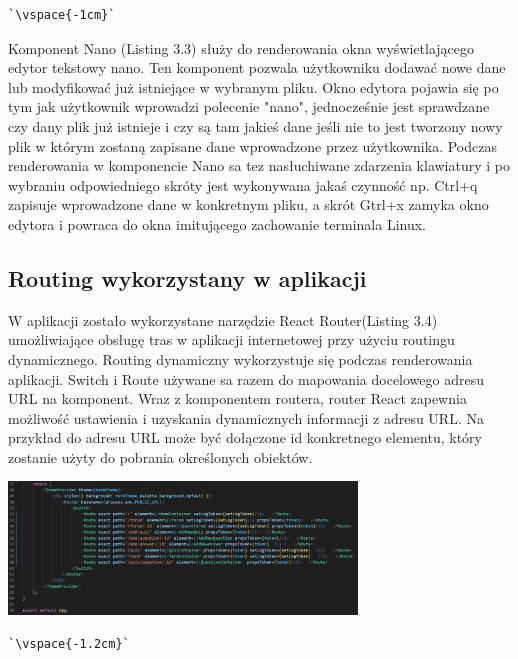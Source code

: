 \documentclass[10pt,a4paper]{report}
\begin{document}
\begin{adjustwidth}{2cm}{2cm}
\begin{center}
\begin{lstlisting}[escapeinside=``,caption={Komponent Nano użyty w projekci}]
`\vspace{-1cm}`
\end{lstlisting}
\end{center}
\begin{minipage}{1\linewidth}
Komponent Nano (Listing 3.3) służy do renderowania okna wyświetlającego edytor tekstowy nano. Ten komponent pozwala użytkowniku dodawać nowe dane lub modyfikować już istniejące w wybranym pliku. Okno edytora pojawia się po tym jak użytkownik wprowadzi polecenie "nano", jednocześnie jest sprawdzane czy dany plik już istnieje i czy są tam jakieś dane jeśli nie to jest tworzony nowy plik w którym zostaną zapisane dane wprowadzone przez użytkownika. Podczas renderowania w komponencie Nano sa tez nasłuchiwane zdarzenia klawiatury i po wybraniu odpowiedniego skróty jest wykonywana jakaś czynność np. Ctrl+q zapisuje wprowadzone dane w konkretnym pliku, a skrót Gtrl+x zamyka okno edytora i powraca do okna imitującego zachowanie terminala Linux.
\end{minipage}
\subsection{Routing wykorzystany w aplikacji}
\begin{minipage}{1\linewidth}
W aplikacji zostało wykorzystane narzędzie React Router(Listing 3.4) umożliwiające obsługę tras w aplikacji internetowej przy użyciu routingu dynamicznego. Routing dynamiczny wykorzystuje się podczas renderowania aplikacji. Switch i Route używane sa razem do mapowania docelowego adresu URL na komponent. Wraz z komponentem routera, router React zapewnia możliwość ustawienia i uzyskania dynamicznych informacji z adresu URL.
Na przykład do adresu URL może być dołączone id konkretnego elementu, który zostanie użyty do pobrania określonych obiektów. 
\end{minipage}
\vspace{0.3cm}
\begin{center}
\includegraphics[width=350px]{code/routers.png} 
\begin{lstlisting}[escapeinside=``,caption={Routing użyty w projekcie}]
`\vspace{-1.2cm}`
\end{lstlisting}
\end{center}

\end{adjustwidth}
\end{document}
